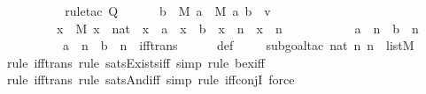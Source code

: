 \begin{isabellebody}
\ \ \ \ \isanewline
\ \ \ \ \isamarkupfalse%
{\isacharparenleft}{\kern0pt}rule{\isacharunderscore}{\kern0pt}tac\ Q{\isacharequal}{\kern0pt}\isanewline
\ \ \ \ \ \ {\isachardoublequoteopen}{\isacharparenleft}{\kern0pt}{\isasymexists}b\ {\isasymin}\ M{\isachardot}{\kern0pt}\ {\isasymexists}a\ {\isasymin}\ M{\isachardot}{\kern0pt}\ {\isacharparenleft}{\kern0pt}{\isacharless}{\kern0pt}a{\isacharcomma}{\kern0pt}\ b{\isachargreater}{\kern0pt}\ {\isacharequal}{\kern0pt}\ v\ {\isasymand}\ \isanewline
\ \ \ \ \ \ \ \ {\isacharparenleft}{\kern0pt}{\isacharparenleft}{\kern0pt}{\isasymexists}x\ {\isasymin}\ M{\isachardot}{\kern0pt}\ x\ {\isasymin}\ nat\ {\isasymand}\ x\ {\isacharequal}{\kern0pt}\ a\ {\isasymand}\ x\ {\isacharequal}{\kern0pt}\ b\ {\isasymand}\ x\ {\isasymnoteq}\ n\ {\isasymand}\ x\ {\isasymnoteq}\ n{\isacharprime}{\kern0pt}{\isacharparenright}{\kern0pt}\ {\isasymor}\ \isanewline
\ \ \ \ \ \ \ \ \ {\isacharparenleft}{\kern0pt}a\ {\isacharequal}{\kern0pt}\ n\ {\isasymand}\ b\ {\isacharequal}{\kern0pt}\ n{\isacharprime}{\kern0pt}{\isacharparenright}{\kern0pt}\ {\isasymor}\ \isanewline
\ \ \ \ \ \ \ \ \ {\isacharparenleft}{\kern0pt}a\ {\isacharequal}{\kern0pt}\ n{\isacharprime}{\kern0pt}\ {\isasymand}\ b\ {\isacharequal}{\kern0pt}\ n{\isacharparenright}{\kern0pt}{\isacharparenright}{\kern0pt}{\isacharparenright}{\kern0pt}{\isacharparenright}{\kern0pt}{\isachardoublequoteclose}\ \ iff{\isacharunderscore}{\kern0pt}trans{\isacharparenright}{\kern0pt}\isanewline
\ \ \ \ \isamarkupfalse%
\ {\isasympsi}{\isacharunderscore}{\kern0pt}def\isanewline
\ \ \ \ \isamarkupfalse%
{\isacharparenleft}{\kern0pt}subgoal{\isacharunderscore}{\kern0pt}tac\ {\isachardoublequoteopen}{\isacharbrackleft}{\kern0pt}nat{\isacharcomma}{\kern0pt}\ n{\isacharcomma}{\kern0pt}\ n{\isacharprime}{\kern0pt}{\isacharbrackright}{\kern0pt}\ {\isasymin}\ list{\isacharparenleft}{\kern0pt}M{\isacharparenright}{\kern0pt}{\isachardoublequoteclose}{\isacharparenright}{\kern0pt}\isanewline
\ \ \ \ \isamarkupfalse%
{\isacharparenleft}{\kern0pt}rule\ iff{\isacharunderscore}{\kern0pt}trans{\isacharcomma}{\kern0pt}\ rule\ sats{\isacharunderscore}{\kern0pt}Exists{\isacharunderscore}{\kern0pt}iff{\isacharcomma}{\kern0pt}\ simp{\isacharcomma}{\kern0pt}\ rule\ bex{\isacharunderscore}{\kern0pt}iff{\isacharparenright}{\kern0pt}{\isacharplus}{\kern0pt}\isanewline
\ \ \ \ \isamarkupfalse%
{\isacharparenleft}{\kern0pt}rule\ iff{\isacharunderscore}{\kern0pt}trans{\isacharcomma}{\kern0pt}\ rule\ sats{\isacharunderscore}{\kern0pt}And{\isacharunderscore}{\kern0pt}iff{\isacharcomma}{\kern0pt}\ simp{\isacharcomma}{\kern0pt}\ rule\ iff{\isacharunderscore}{\kern0pt}conjI{\isacharcomma}{\kern0pt}\ force{\isacharparenright}{\kern0pt}\isanewline

\end{isabellebody}
